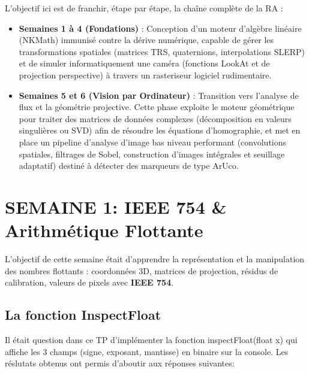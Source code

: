 \documentclass[12pt,a4paper]{report}
\begin{document}
L'objectif ici est de franchir, étape par étape, la chaîne complète de la RA :
\begin{itemize}
    \item \textbf{Semaines 1 à 4 (Fondations)} : Conception d'un moteur d'algèbre linéaire (NKMath) immunisé contre la dérive numérique, capable de gérer les transformations spatiales (matrices TRS, quaternions, interpolations SLERP) et de simuler informatiquement une caméra (fonctions LookAt et de projection perspective) à travers un rasteriseur logiciel rudimentaire.
    \item \textbf{Semaines 5 et 6 (Vision par Ordinateur)} : Transition vers l'analyse de flux et la géométrie projective. Cette phase exploite le moteur géométrique pour traiter des matrices de données complexes (décomposition en valeurs singulières ou SVD) afin de résoudre les équations d'homographie, et met en place un pipeline d'analyse d'image bas niveau performant (convolutions spatiales, filtrages de Sobel, construction d'images intégrales et seuillage adaptatif) destiné à détecter des marqueurs de type ArUco.
\end{itemize}



\chapter{SEMAINE 1: IEEE 754 & Arithmétique Flottante}

L'objectif de cette semaine était d'apprendre la représentation et la manipulation des nombres flottants : coordonnées 3D, matrices de projection, résidus de calibration, valeurs de pixels avec \textbf{IEEE 754}.

\section{La fonction InspectFloat}

Il était question dans ce TP d'implémenter la fonction inspectFloat(float x) qui affiche les 3 champs (signe, exposant, mantisse) en binaire sur la console. Les réslutats obtenus ont permis d'aboutir aux réponses suivantes:
\end{document}
